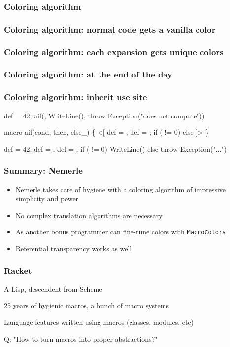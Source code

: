 \documentclass[hyperref={bookmarks=false}]{beamer}
\begin{document}
\begin{frame}[fragile]
\frametitle<1>{Coloring algorithm}
\frametitle<2>{Coloring algorithm: normal code gets a vanilla color}
\frametitle<3>{Coloring algorithm: each expansion gets unique colors}
\frametitle<4>{Coloring algorithm: at the end of the day}
\frametitle<5>{Coloring algorithm: inherit use site}
\begin{semiverbatim}
def  = 42;                 
aif(,
  WriteLine(),
  throw Exception("does not compute"))

macro aif(cond, then, else_) \{      
  <[
    def  = ;
    def  = ;
    if ( != 0)  else 
  ]>
\}

def  = 42;                 
def  = ;
def  = ;
if ( != 0) WriteLine() else throw Exception("...")
\end{semiverbatim}
\end{frame}

\begin{frame}[fragile]
\frametitle{Summary: Nemerle}
\begin{itemize}
\item Nemerle takes care of hygiene with a coloring algorithm of impressive simplicity and power
\item No complex translation algorithms are necessary
\item As another bonus programmer can fine-tune colors with \texttt{MacroColors}
\item Referential transparency works as well
\end{itemize}
\end{frame}

\begin{frame}[fragile]
\frametitle{Racket}
A Lisp, descendent from Scheme

25 years of hygienic macros, a bunch of macro systems

Language features written using macros (classes, modules, etc)

Q: "How to turn macros into proper abstractions?"
\end{frame}
\end{document}
